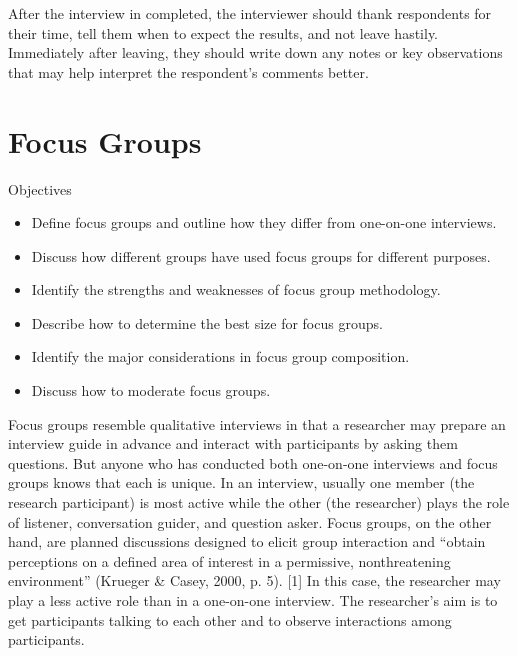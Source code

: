After the interview in completed, the interviewer should thank respondents for their time, tell them when to expect the results, and not leave hastily. Immediately after leaving, they should write down any notes or key observations that may help interpret the respondent’s comments better.

\section{Focus Groups}

\begin{center}
	\begin{objbox}{Objectives}
		\begin{itemize}
			\setlength{\itemsep}{0pt}
			\setlength{\parskip}{0pt}
			\setlength{\parsep}{0pt}
			
			\item Define focus groups and outline how they differ from one-on-one interviews.
			\item Discuss how different groups have used focus groups for different purposes.
			\item Identify the strengths and weaknesses of focus group methodology.
			\item Describe how to determine the best size for focus groups.
			\item Identify the major considerations in focus group composition.
			\item Discuss how to moderate focus groups.
			
		\end{itemize}
	\end{objbox}
\end{center}

Focus groups resemble qualitative interviews in that a researcher may prepare an interview guide in advance and interact with participants by asking them questions. But anyone who has conducted both one-on-one interviews and focus groups knows that each is unique. In an interview, usually one member (the research participant) is most active while the other (the researcher) plays the role of listener, conversation guider, and question asker. Focus groups, on the other hand, are planned discussions designed to elicit group interaction and “obtain perceptions on a defined area of interest in a permissive, nonthreatening environment” (Krueger \& Casey, 2000, p. 5). [1] In this case, the researcher may play a less active role than in a one-on-one interview. The researcher’s aim is to get participants talking to each other and to observe interactions among participants.

